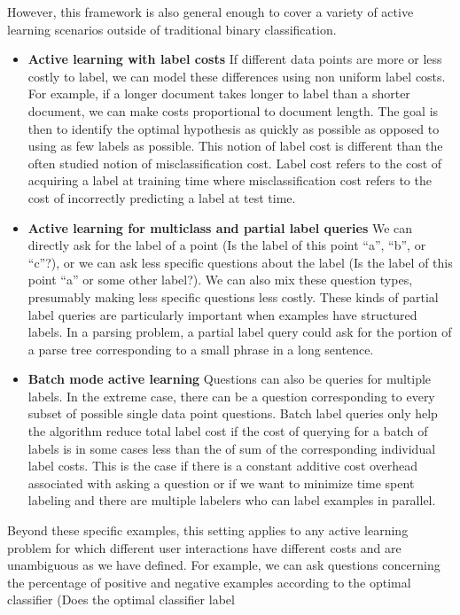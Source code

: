 \documentclass{article}
\begin{document}
However, this framework is also general enough to cover a variety of active
learning scenarios outside of traditional binary classification.
\begin{itemize}
\item \textbf{Active learning with label costs} If different data
points are more or less costly to label, we can model these
differences using non uniform label costs.  For example, if a longer
document takes longer to label than a shorter document,
we can make costs proportional to document length.  The goal is
then to identify the optimal hypothesis as quickly as possible as
opposed to using as few labels as possible. 
This notion of label cost is different than the often studied
notion of misclassification cost.  Label cost refers to the cost of
acquiring a label at training time where misclassification cost
refers to the cost of incorrectly predicting a label at test time.
\item \textbf{Active learning for multiclass and partial
label queries}
We can directly ask for the label of a point 
(Is the label of this point ``a'', ``b'', or
``c''?), or we can ask less specific questions about the label (Is the label
of this point ``a'' or some other label?).  We can also mix these question 
types, presumably making less specific questions less costly.  These
kinds of partial label queries are particularly important when examples
have structured labels.  In a parsing problem, a partial
label query could ask for the portion of a parse tree corresponding
to a small phrase in a long sentence.
\item \textbf{Batch mode active learning} Questions can also be
queries for multiple labels.  In the extreme case, there can be a
question corresponding to every subset of possible single data point
questions.  Batch label queries only help the algorithm reduce total
label cost if the cost of querying for a batch of labels is in some
cases less than the of sum of the corresponding individual label
costs.  This is the case if there is a constant
additive cost overhead associated with asking a question or if we
want to minimize time spent labeling and there
are multiple labelers who can label examples in parallel.
\end{itemize}
Beyond these specific examples, this setting applies to any active
learning problem for which different user interactions have different
costs and are unambiguous as we have defined.  For example, we can ask
questions concerning the percentage of positive and negative examples
according to the optimal classifier (Does the optimal classifier label
\end{document}
